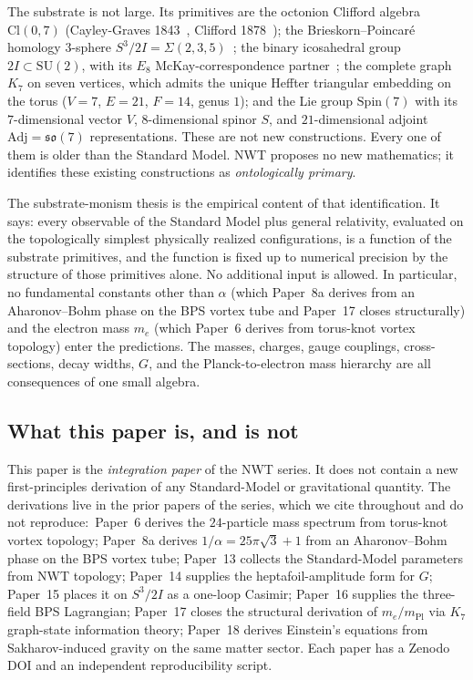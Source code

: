 \documentclass[11pt]{article}
\newcommand{\so}{\mathfrak{so}}
\newcommand{\Spin}{\mathrm{Spin}}
\newcommand{\Adj}{\mathrm{Adj}}
\newcommand{\mPl}{m_{\mathrm{Pl}}}
\newcommand{\me}{m_e}
\newcommand{\SU}{\mathrm{SU}}
\begin{document}
The substrate is not large.  Its primitives are the octonion
Clifford algebra $\mathrm{Cl}(0,7)$ (Cayley-Graves
1843~\cite{cayley1845}, Clifford 1878~\cite{clifford1878}); the
Brieskorn--Poincar\'e homology $3$-sphere
$S^3/2I = \Sigma(2,3,5)$~\cite{poincare1904, brieskorn1966}; the
binary icosahedral group $2I \subset \SU(2)$, with its $E_8$
McKay-correspondence partner~\cite{mckay1980}; the complete graph
$K_7$ on seven vertices, which admits the unique Heffter triangular
embedding on the torus ($V=7$, $E=21$, $F=14$, genus $1$); and the
Lie group $\Spin(7)$ with its $7$-dimensional vector $V$,
$8$-dimensional spinor $S$, and $21$-dimensional adjoint
$\Adj = \so(7)$ representations.  These are not new constructions.
Every one of them is older than the Standard Model.  NWT proposes
no new mathematics; it identifies these existing constructions as
\emph{ontologically primary}.

The substrate-monism thesis is the empirical content of that
identification.  It says: every observable of the Standard Model
plus general relativity, evaluated on the topologically simplest
physically realized configurations, is a function of the substrate
primitives, and the function is fixed up to numerical precision by
the structure of those primitives alone.  No additional input is
allowed.  In particular, no fundamental constants other than
$\alpha$ (which Paper~8a derives from an Aharonov--Bohm phase on
the BPS vortex tube and Paper~17 closes structurally) and the
electron mass $\me$ (which Paper~6 derives from torus-knot vortex
topology) enter the predictions.  The masses, charges, gauge
couplings, cross-sections, decay widths, $G$, and the
Planck-to-electron mass hierarchy are all consequences of one small
algebra.

\subsection{What this paper is, and is not}

This paper is the \emph{integration paper} of the NWT series.  It
does not contain a new first-principles derivation of any
Standard-Model or gravitational quantity.  The derivations live
in the prior papers of the series, which we cite throughout and
do not reproduce:\ Paper~6 derives the $24$-particle mass
spectrum from torus-knot vortex topology; Paper~8a derives
$1/\alpha = 25\pi\sqrt{3} + 1$ from an Aharonov--Bohm phase on
the BPS vortex tube; Paper~13 collects the Standard-Model
parameters from NWT topology; Paper~14 supplies the
heptafoil-amplitude form for $G$; Paper~15 places it on
$S^3/2I$ as a one-loop Casimir; Paper~16 supplies the
three-field BPS Lagrangian; Paper~17 closes the structural
derivation of $\me/\mPl$ via $K_7$ graph-state information
theory; Paper~18 derives Einstein's equations from
Sakharov-induced gravity on the same matter sector.  Each paper
has a Zenodo DOI and an independent reproducibility script.
\end{document}
